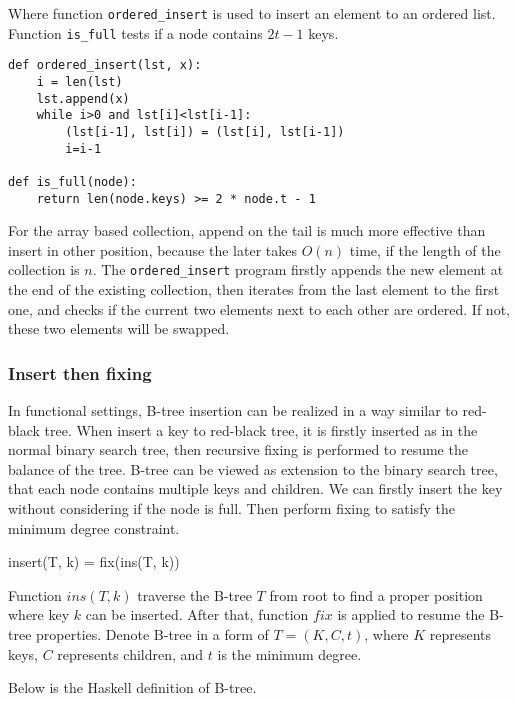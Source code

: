 \documentclass{article}
\begin{document}
Where function \texttt{ordered\_insert} is used to insert an element
to an ordered list. Function \texttt{is\_full} tests if a node contains
$2t-1$ keys.

\begin{lstlisting}
def ordered_insert(lst, x):
    i = len(lst)
    lst.append(x)
    while i>0 and lst[i]<lst[i-1]:
        (lst[i-1], lst[i]) = (lst[i], lst[i-1])
        i=i-1

def is_full(node):
    return len(node.keys) >= 2 * node.t - 1
\end{lstlisting}

For the array based collection, append on the tail is much more effective than
insert in other position, because the later takes $O(n)$ time, if the length
of the collection is $n$. The \texttt{ordered\_insert} program firstly appends
 the new element at the end of the existing collection, then iterates from the
last element to the first one, and checks if the current two elements next to each other
are ordered. If not, these two elements will be swapped.


\subsubsection{Insert then fixing}

In functional settings, B-tree insertion can be realized in a way similar to
red-black tree. When insert a key to red-black tree, it is firstly inserted
as in the normal binary search tree, then recursive fixing is performed to
resume the balance of the tree. B-tree can be viewed as extension to the
binary search tree, that each node contains multiple keys and children.
We can firstly insert the key without considering if the node is full.
Then perform fixing to satisfy the minimum degree constraint.

\be
insert(T, k) = fix(ins(T, k))
\ee

Function $ins(T, k)$ traverse the B-tree $T$ from root to find a proper
position where key $k$ can be inserted. After that, function $fix$ is
applied to resume the B-tree properties. Denote B-tree in a form of
$T = (K, C, t)$, where $K$ represents keys, $C$ represents children,
and $t$ is the minimum degree.

Below is the Haskell definition of B-tree.
\end{document}
